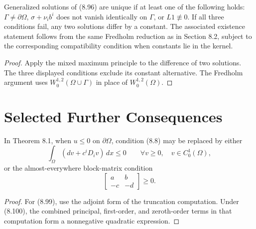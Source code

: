 \begin{corollary}
\label{gt-cor-8-mixed-boundary-uniqueness}
Generalized solutions of (8.96) are unique if at least one of the following holds:
$\Gamma\neq\partial\Omega$, $\sigma+\nu_i b^i$ does not vanish identically on
$\Gamma$, or $L1\not\equiv0$. If all three conditions fail, any two solutions
differ by a constant. The associated existence statement follows from the same
Fredholm reduction as in Section 8.2, subject to the corresponding compatibility
condition when constants lie in the kernel.
\end{corollary}
\begin{proof}
\sketch Apply the mixed maximum principle to the difference of two solutions.
The three displayed conditions exclude its constant alternative. The Fredholm
argument uses $W_0^{1,2}(\Omega\cup\Gamma)$ in place of
$W_0^{1,2}(\Omega)$.
\end{proof}

\section*{Selected Further Consequences}

\begin{proposition}
\label{gt-prop-8-alternative-maximum-hypotheses}
In Theorem 8.1, when $u\leq0$ on $\partial\Omega$, condition (8.8) may be
replaced by either
\begin{equation}
\int_\Omega(dv+c^iD_iv)\,dx\leq0
\qquad\forall v\geq0,\quad v\in C_0^1(\Omega),
\tag{8.99}
\end{equation}
or the almost-everywhere block-matrix condition
\begin{equation}
\begin{bmatrix}
a&b\\
-c&-d
\end{bmatrix}\geq0.
\tag{8.100}
\end{equation}
\end{proposition}
\begin{proof}
\sketch For (8.99), use the adjoint form of the truncation computation. Under
(8.100), the combined principal, first-order, and zeroth-order terms in that
computation form a nonnegative quadratic expression.
\end{proof}

